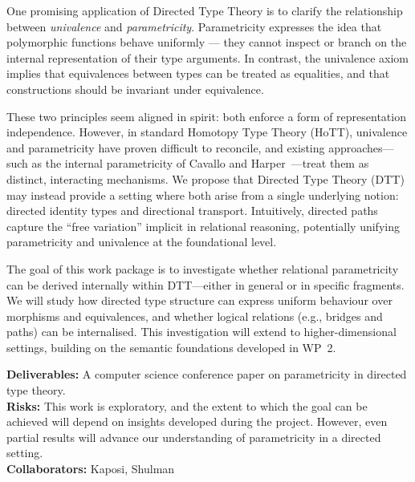 \documentclass[a4paper,11pt]{article}
\renewcommand{\paragraph}[1]{\textbf{#1.}}
\begin{document}
One promising application of Directed Type Theory is to clarify the
relationship between \emph{univalence} and
\emph{parametricity}. Parametricity expresses the idea that
polymorphic functions behave uniformly — they cannot inspect or branch
on the internal representation of their type arguments. In contrast,
the univalence axiom implies that equivalences between types can be
treated as equalities, and that constructions should be invariant
under equivalence.



These two principles seem aligned in spirit: both enforce a form of
representation independence. However, in standard Homotopy Type Theory
(HoTT), univalence and parametricity have proven difficult to
reconcile, and existing approaches—such as the internal parametricity
of Cavallo and Harper~\cite{cavallo2020}—treat them as distinct,
interacting mechanisms. We propose that Directed Type Theory (DTT) may
instead provide a setting where both arise from a single underlying
notion: directed identity types and directional
transport. Intuitively, directed paths capture the “free variation”
implicit in relational reasoning, potentially unifying parametricity
and univalence at the foundational level.

The goal of this work package is to investigate whether relational
parametricity can be derived internally within DTT—either in general
or in specific fragments. We will study how directed type structure
can express uniform behaviour over morphisms and equivalences, and
whether logical relations (e.g., bridges and paths) can be
internalised. This investigation will extend to higher-dimensional
settings, building on the semantic foundations developed in WP~2.

\textbf{Deliverables:} A computer science conference paper on
parametricity in directed type theory.
\\
\textbf{Risks:} This work is exploratory, and the extent to which the
goal can be achieved will depend on insights developed during the
project. However, even partial results will advance our understanding
of parametricity in a directed setting.
\\
\textbf{Collaborators:} Kaposi, Shulman
\end{document}
